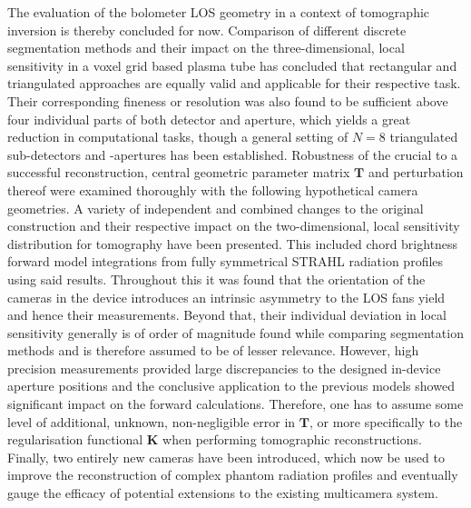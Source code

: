%
        \newline%
        The evaluation of the bolometer LOS geometry in a context of tomographic inversion is thereby concluded for now. Comparison of different discrete segmentation methods and their impact on the three-dimensional, local sensitivity in a voxel grid based plasma tube has concluded that rectangular and triangulated approaches are equally valid and applicable for their respective task. Their corresponding fineness or resolution was also found to be sufficient above four individual parts of both detector and aperture, which yields a great reduction in computational tasks, though a general setting of $N=8$ triangulated sub-detectors and -apertures has been established. Robustness of the crucial to a successful reconstruction, central geometric parameter matrix $\mathbf{T}$ and perturbation thereof were examined thoroughly with the following hypothetical camera geometries. A variety of independent and combined changes to the original construction and their respective impact on the two-dimensional, local sensitivity distribution for tomography have been presented. This included chord brightness forward model integrations from fully symmetrical STRAHL radiation profiles using said results. Throughout this it was found that the orientation of the cameras in the device introduces an intrinsic asymmetry to the LOS fans yield and hence their measurements. Beyond that, their individual deviation in local sensitivity  generally is of order of magnitude found while comparing segmentation methods and is therefore assumed to be of lesser relevance. However, high precision measurements provided large discrepancies to the designed in-device aperture positions and the conclusive application to the previous models showed significant impact on the forward calculations. Therefore, one has to assume some level of additional, unknown, non-negligible error in $\mathbf{T}$, or more specifically to the regularisation functional $\mathbf{K}$ when performing tomographic reconstructions. Finally, two entirely new cameras have been introduced, which now be used to improve the reconstruction of complex phantom radiation profiles and eventually gauge the efficacy of potential extensions to the existing multicamera system.%
%
